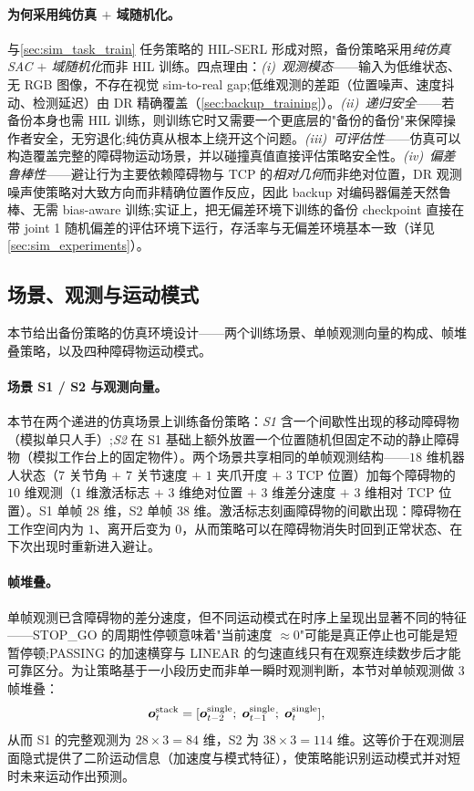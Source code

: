 \paragraph{为何采用纯仿真 $+$ 域随机化。}与\cref{sec:sim_task_train} 任务策略的 HIL-SERL 形成对照，备份策略采用\emph{纯仿真 SAC $+$ 域随机化}而非 HIL 训练。四点理由：\emph{(i)~观测模态}——输入为低维状态、无 RGB 图像，不存在视觉 sim-to-real gap;低维观测的差距（位置噪声、速度抖动、检测延迟）由 DR 精确覆盖（\cref{sec:backup_training}）。\emph{(ii)~递归安全}——若备份本身也需 HIL 训练，则训练它时又需要一个更底层的"备份的备份"来保障操作者安全，无穷退化;纯仿真从根本上绕开这个问题。\emph{(iii)~可评估性}——仿真可以构造覆盖完整的障碍物运动场景，并以碰撞真值直接评估策略安全性。\emph{(iv)~偏差鲁棒性}——避让行为主要依赖障碍物与 TCP 的\emph{相对几何}而非绝对位置，DR 观测噪声使策略对大致方向而非精确位置作反应，因此 backup 对编码器偏差天然鲁棒、无需 bias-aware 训练;实证上，把无偏差环境下训练的备份 checkpoint 直接在带 joint 1 随机偏差的评估环境下运行，存活率与无偏差环境基本一致（详见\cref{sec:sim_experiments}）。

\subsection{场景、观测与运动模式}\label{sec:scenarios}

本节给出备份策略的仿真环境设计——两个训练场景、单帧观测向量的构成、帧堆叠策略，以及四种障碍物运动模式。

\paragraph{场景 S1 / S2 与观测向量。}本节在两个递进的仿真场景上训练备份策略：\emph{S1} 含一个间歇性出现的移动障碍物（模拟单只人手）;\emph{S2} 在 S1 基础上额外放置一个位置随机但固定不动的静止障碍物（模拟工作台上的固定物件）。两个场景共享相同的单帧观测结构——$18$ 维机器人状态（$7$ 关节角 $+$ $7$ 关节速度 $+$ $1$ 夹爪开度 $+$ $3$ TCP 位置）加每个障碍物的 $10$ 维观测（$1$ 维激活标志 $+$ $3$ 维绝对位置 $+$ $3$ 维差分速度 $+$ $3$ 维相对 TCP 位置）。S1 单帧 $28$ 维，S2 单帧 $38$ 维。激活标志刻画障碍物的间歇出现：障碍物在工作空间内为 $1$、离开后变为 $0$，从而策略可以在障碍物消失时回到正常状态、在下次出现时重新进入避让。

\paragraph{帧堆叠。}单帧观测已含障碍物的差分速度，但不同运动模式在时序上呈现出显著不同的特征——STOP\_GO 的周期性停顿意味着"当前速度 $\approx 0$"可能是真正停止也可能是短暂停顿;PASSING 的加速横穿与 LINEAR 的匀速直线只有在观察连续数步后才能可靠区分。为让策略基于一小段历史而非单一瞬时观测判断，本节对单帧观测做 $3$ 帧堆叠：
\begin{equation*}
  \bm{o}_t^{\text{stack}} = [\bm{o}_{t-2}^{\text{single}};\; \bm{o}_{t-1}^{\text{single}};\; \bm{o}_t^{\text{single}}],
\end{equation*}
从而 S1 的完整观测为 $28 \times 3 = 84$ 维，S2 为 $38 \times 3 = 114$ 维。这等价于在观测层面隐式提供了二阶运动信息（加速度与模式特征），使策略能识别运动模式并对短时未来运动作出预测。

